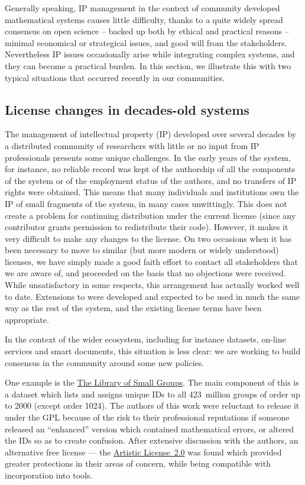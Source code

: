 \documentclass{deliverablereport}
\begin{document}
Generally speaking, IP management in the context of community
developed mathematical systems causes little difficulty, thanks to a
quite widely spread consensus on open science -- backed up both by
ethical and practical reasons -- minimal economical or strategical
issues, and good will from the stakeholders. Nevertheless IP issues
occasionally arise while integrating complex systems, and they can
become a practical burden. In this section, we illustrate this with
two typical situations that occurred recently in our communities.

\subsection{License changes in decades-old systems}

The management of intellectual property (IP) developed over several
decades by a distributed community of researchers with
little or no input from IP professionals
presents some unique challenges. In the early years of the \GAP
system, for instance, no reliable record was kept of the authorship of
all the components of the system or of the employment status of the
authors, and no transfers of IP rights were obtained. This means that
many individuals and institutions own the IP of small
fragments of the system, in many cases unwittingly.
This does not create a problem for continuing
distribution under the current license (since any contributor
grants permission to redistribute their code).
However, it makes it very difficult to make any changes to the
license. On two occasions when it has been necessary to move to
similar (but more modern or widely understood) licenses, we have simply
made a good faith effort to contact all stakeholders that we are aware
of, and proceeded on the basis that no objections were received.
While unsatisfactory in some respects, this arrangement has actually
worked well to date.
Extensions to \GAP were developed and expected to be used
in much the same way as the rest of the system, and the existing
license terms have been appropriate.

In the context of the wider \ODK
ecosystem, including for instance datasets, on-line services and smart
documents, this situation is less clear: we are working to build
consensus in the \GAP community around some new policies.

One example is the \href{https://www.gap-system.org/Packages/smallgrp.html}{The Library of Small Groups}. The main
component of this is a dataset which lists and assigns unique IDs to
all 423~million groups of order up to 2000 (except order 1024). The
authors of this work were reluctant to release it under the GPL
because of the risk to their professional reputations if someone
released an ``enhanced'' version which contained mathematical errors,
or altered the IDs so as to create confusion. After extensive
discussion with the authors, an alternative free license --- the
\href{https://opensource.org/licenses/Artistic-2.0}{Artistic License~2.0}
was found which provided greater
protections in their areas of concern, while being compatible with
incorporation into \ODK tools.
\end{document}
